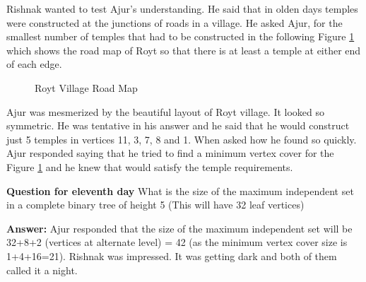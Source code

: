 Rishnak wanted to test Ajur's understanding. He said that in olden days temples were constructed at the junctions of roads in a village. He asked Ajur, for the smallest number of temples that had to be constructed in the following Figure \ref{13g6} which shows the road map of Royt so that there is at least a temple at either end of each edge.
\begin{figure}
\begin{center}

\caption{ Royt Village Road Map}\label{13g6}
\end{center}
\end{figure}

Ajur was mesmerized by the beautiful layout of Royt village. It looked so symmetric. He was tentative in his answer and he said that he would construct just 5 temples in vertices 11, 3, 7, 8 and 1.   When asked how he found so quickly. Ajur responded saying that he tried to find a minimum vertex cover for the Figure \ref{13g6} and he knew that would satisfy the temple requirements.

\textbf{Question for eleventh day} What is the size of the maximum independent set in a complete binary tree of height 5 (This will have 32 leaf vertices)

\textbf{Answer:} Ajur responded that the size of the maximum independent set will be 32+8+2 (vertices at alternate level) = 42 (as the minimum vertex cover size is 1+4+16=21).
Rishnak was impressed. It was getting dark and both of them called it a night.
